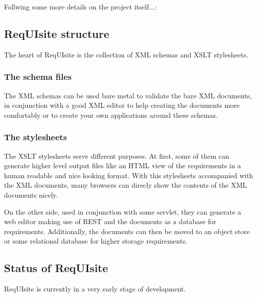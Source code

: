 Follwing some more details on the project itself...\+:

\subsection*{Req\+U\+Isite structure}

The heart of Req\+U\+Isite is the collection of X\+ML schemas and X\+S\+LT stylesheets.

\subsubsection*{The schema files}

The X\+ML schemas can be used bare metal to validate the bare X\+ML documents, in conjunction with a good X\+ML editor to help creating the documents more comfortably or to create your own applications around these schemas.

\subsubsection*{The stylesheets}

The X\+S\+LT stylesheets serve different purposes. At first, some of them can generate higher level output files like an H\+T\+ML view of the requirements in a human readable and nice looking format. With this stylesheets accompanied with the X\+ML documents, many browsers can direcly show the contents of the X\+ML documents nicely.

On the other side, used in conjunction with some servlet, they can generate a web editor making use of R\+E\+ST and the documents as a database for requirements. Additionally, the documents can then be moved to an object store or some relational database for higher storage requirements.

\subsection*{Status of Req\+U\+Isite}

Req\+U\+Isite is currently in a very early stage of development. 